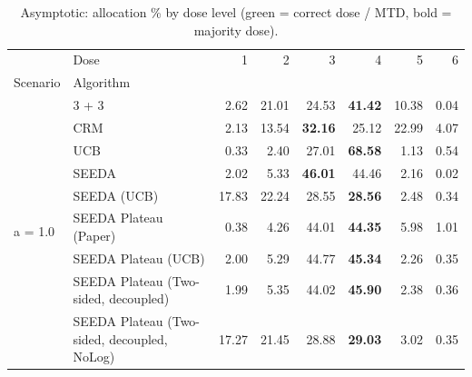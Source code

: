 \begin{table}[H]
\centering
\caption{Asymptotic: allocation \% by dose level (green = correct dose / MTD, bold = majority dose).}
\label{tab:asym_alloc_by_dose}
\begin{tabular}{llrrrrrr}
\toprule
 & Dose & 1 & 2 & 3 & 4 & 5 & 6 \\
Scenario & Algorithm &  &  &  &  &  &  \\
\midrule
\multirow[c]{9}{*}{a = 1.0} & 3 + 3 & 2.62 & 21.01 & {\cellcolor[HTML]{C8E6C9}} 24.53 & \bfseries 41.42 & 10.38 & 0.04 \\
 & CRM & 2.13 & 13.54 & {\cellcolor[HTML]{C8E6C9}} \bfseries 32.16 & 25.12 & 22.99 & 4.07 \\
 & UCB & 0.33 & 2.40 & {\cellcolor[HTML]{C8E6C9}} 27.01 & \bfseries 68.58 & 1.13 & 0.54 \\
 & SEEDA & 2.02 & 5.33 & {\cellcolor[HTML]{C8E6C9}} \bfseries 46.01 & 44.46 & 2.16 & 0.02 \\
 & SEEDA (UCB) & 17.83 & 22.24 & {\cellcolor[HTML]{C8E6C9}} 28.55 & \bfseries 28.56 & 2.48 & 0.34 \\
 & SEEDA Plateau (Paper) & 0.38 & 4.26 & {\cellcolor[HTML]{C8E6C9}} 44.01 & \bfseries 44.35 & 5.98 & 1.01 \\
 & SEEDA Plateau (UCB) & 2.00 & 5.29 & {\cellcolor[HTML]{C8E6C9}} 44.77 & \bfseries 45.34 & 2.26 & 0.35 \\
 & SEEDA Plateau (Two-sided, decoupled) & 1.99 & 5.35 & {\cellcolor[HTML]{C8E6C9}} 44.02 & \bfseries 45.90 & 2.38 & 0.36 \\
 & SEEDA Plateau (Two-sided, decoupled, NoLog) & 17.27 & 21.45 & {\cellcolor[HTML]{C8E6C9}} 28.88 & \bfseries 29.03 & 3.02 & 0.35 \\
\bottomrule
\end{tabular}
\end{table}

